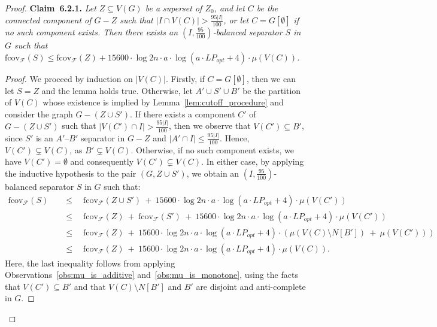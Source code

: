 \documentclass[11pt]{amsart}
\newcommand{\lpopt}{LP_{opt}}
\begin{document}
\begin{proof}
    \noindent\textbf{Claim~6.2.1.}\label{claim:balanced_sep_cutoff_step}
        \emph{Let $Z\subseteq V(G)$ be a superset of $Z_0$, and let $C$ be the connected component of $G - Z$ such that $|I\cap V(C)| > \frac{95|I|}{100}$, or let $C = G[\emptyset]$ if no such component exists. Then there exists an $(I, \frac{95}{100})$-balanced separator $S$ in $G$ such that $\mathrm{fcov}_{\mathcal{F}}(S) \leq \mathrm{fcov}_{\mathcal{F}}(Z) + 15600 \cdot \log 2n \cdot a \cdot \log(a \cdot \lpopt + 4) \cdot \mu(V(C))$.}
    \begin{proof}
        We proceed by induction on $|V(C)|$. Firstly, if $C = G[\emptyset]$, then we can let $S = Z$ and the lemma holds true. Otherwise, let $A'\cup S'\cup B'$ be the partition of $V(C)$ whose existence is implied by Lemma~\ref{lem:cutoff_procedure} and consider the graph $G-(Z\cup S')$. If there exists a component $C'$ of $G - (Z \cup S')$ such that $|V(C') \cap I| > \frac{95|I|}{100}$, then we observe that $V(C') \subseteq B'$, since $S'$ is an $A'$--$B'$ separator in $G - Z$ and $|A' \cap I| \leq \frac{95|I|}{100}$. Hence, $V(C') \subsetneq V(C)$, as $B' \subsetneq V(C)$. Otherwise, if no such component exists, we have $V(C') = \emptyset$ and consequently $V(C')\subsetneq V(C)$. In either case, by applying the inductive hypothesis to the pair $(G, Z \cup S')$, we obtain an $(I, \frac{95}{100})$-balanced separator $S$ in $G$ such that:
        \begin{align*}
            \mathrm{fcov}_{\mathcal{F}}(S) \quad
            &\leq \quad \mathrm{fcov}_{\mathcal{F}}(Z \cup S')\ +\ 15600 \cdot \log 2n \cdot a \cdot  \log(a \cdot \lpopt + 4) \cdot \mu(V(C')) \\
            &\leq \quad \mathrm{fcov}_{\mathcal{F}}(Z)\ +\ \mathrm{fcov}_{\mathcal{F}}(S')\ +\ 15600 \cdot \log 2n \cdot a \cdot  \log(a \cdot \lpopt + 4) \cdot \mu(V(C')) \\
            &\leq \quad \mathrm{fcov}_{\mathcal{F}}(Z)\ +\ 15600 \cdot \log 2n \cdot a \cdot  \log(a \cdot \lpopt + 4) \cdot \left(\mu(V(C)\setminus N[B'])\ +\ \mu(V(C'))\right) \\
            &\leq \quad \mathrm{fcov}_{\mathcal{F}}(Z)\ +\ 15600 \cdot \log 2n \cdot a \cdot  \log(a \cdot \lpopt + 4) \cdot \mu(V(C)).
        \end{align*}
        Here, the last inequality follows from applying Observations~\ref{obs:mu_is_additive} and~\ref{obs:mu_is_monotone}, using the facts that $V(C') \subseteq B'$ and that $V(C) \setminus N[B']$ and $B'$ are disjoint and anti-complete in $G$.

\end{proof}
\end{proof}
\end{document}
